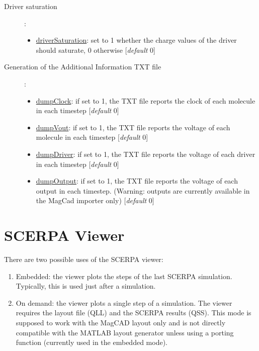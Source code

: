 \documentclass[a4paper,10pt]{article}
\begin{document}
\begin{description}
\item[Driver saturation]:
	\begin{itemize}
	\item \underline{driverSaturation}: set to 1 whether the charge values of the driver should saturate, 0 otherwise [\textit{default} 0]
	\end{itemize}
\item[Generation of the Additional Information TXT file]:
\begin{itemize}
	\item \underline{dumpClock}: if set to 1, the TXT file reports the clock of each molecule in each timestep [\textit{default} 0]
	\item \underline{dumpVout}: if set to 1, the TXT file reports the voltage of each molecule in each timestep [\textit{default} 0]
	\item \underline{dumpDriver}: if set to 1, the TXT file reports the voltage of each driver in each timestep [\textit{default} 0]
	\item \underline{dumpOutput}: if set to 1, the TXT file reports the voltage of each output in each timestep. (Warning: outputs are currently available in the MagCad importer only) [\textit{default} 0]
\end{itemize}
\end{description}

\section{SCERPA Viewer}
There are two possible uses of the SCERPA viewer:

\begin{enumerate}
\item Embedded: the viewer plots the steps of the last SCERPA simulation. Typically, this is used just after a simulation. 
\item On demand: the viewer plots a single step of a simulation. The viewer requires the layout file (QLL) and the SCERPA results (QSS). This mode is supposed to work with the MagCAD layout only and is not directly compatible with the MATLAB layout generator unless using a porting function (currently used in the embedded mode).
\end{enumerate}
\end{document}
